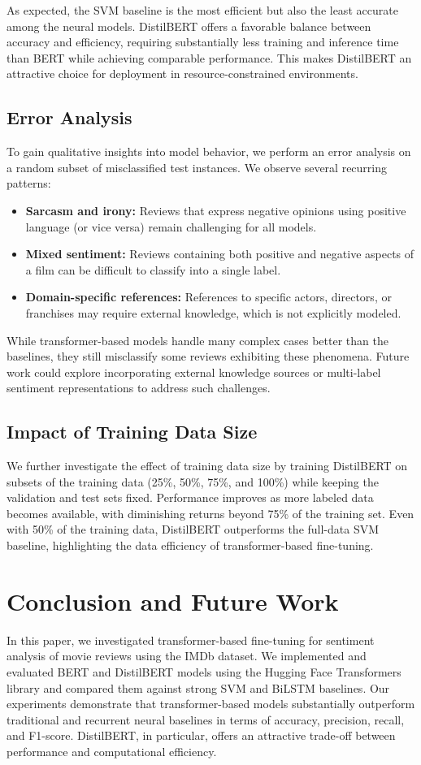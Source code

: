 \documentclass[conference]{IEEEtran}
\begin{document}
As expected, the SVM baseline is the most efficient but also the least accurate among the neural models. DistilBERT offers a favorable balance between accuracy and efficiency, requiring substantially less training and inference time than BERT while achieving comparable performance. This makes DistilBERT an attractive choice for deployment in resource-constrained environments.

\subsection{Error Analysis}
To gain qualitative insights into model behavior, we perform an error analysis on a random subset of misclassified test instances. We observe several recurring patterns:
\begin{itemize}
    \item \textbf{Sarcasm and irony:} Reviews that express negative opinions using positive language (or vice versa) remain challenging for all models.
    \item \textbf{Mixed sentiment:} Reviews containing both positive and negative aspects of a film can be difficult to classify into a single label.
    \item \textbf{Domain-specific references:} References to specific actors, directors, or franchises may require external knowledge, which is not explicitly modeled.
\end{itemize}

While transformer-based models handle many complex cases better than the baselines, they still misclassify some reviews exhibiting these phenomena. Future work could explore incorporating external knowledge sources or multi-label sentiment representations to address such challenges.

\subsection{Impact of Training Data Size}
We further investigate the effect of training data size by training DistilBERT on subsets of the training data (25\%, 50\%, 75\%, and 100\%) while keeping the validation and test sets fixed. Performance improves as more labeled data becomes available, with diminishing returns beyond 75\% of the training set. Even with 50\% of the training data, DistilBERT outperforms the full-data SVM baseline, highlighting the data efficiency of transformer-based fine-tuning.

\section{Conclusion and Future Work}
\label{sec:conclusion}
In this paper, we investigated transformer-based fine-tuning for sentiment analysis of movie reviews using the IMDb dataset. We implemented and evaluated BERT and DistilBERT models using the Hugging Face Transformers library and compared them against strong SVM and BiLSTM baselines. Our experiments demonstrate that transformer-based models substantially outperform traditional and recurrent neural baselines in terms of accuracy, precision, recall, and F1-score. DistilBERT, in particular, offers an attractive trade-off between performance and computational efficiency.
\end{document}
